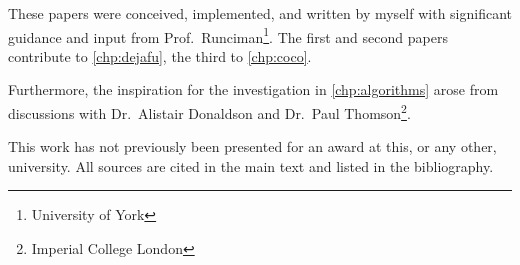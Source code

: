 These papers were conceived, implemented, and written by myself with significant
guidance and input from Prof.~Runciman\footnote{University of York}.  The first
and second papers contribute to \cref{chp:dejafu}, the third to \cref{chp:coco}.

Furthermore, the inspiration for the investigation in \cref{chp:algorithms} arose
from discussions with Dr.~Alistair Donaldson and Dr.~Paul
Thomson\footnote{Imperial College London}.

This work has not previously been presented for an award at this, or any other,
university.  All sources are cited in the main text and listed in the
bibliography.

